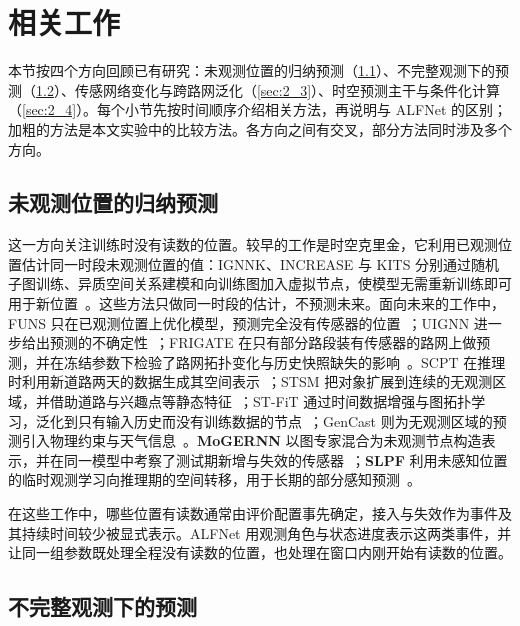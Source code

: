 \section{相关工作}\label{sec:related}
本节按四个方向回顾已有研究：未观测位置的归纳预测（\ref{sec:2_1}）、不完整观测下的预测（\ref{sec:2_2}）、传感网络变化与跨路网泛化（\ref{sec:2_3}）、时空预测主干与条件化计算（\ref{sec:2_4}）。每个小节先按时间顺序介绍相关方法，再说明与 ALFNet 的区别；加粗的方法是本文实验中的比较方法。各方向之间有交叉，部分方法同时涉及多个方向。

\subsection{未观测位置的归纳预测}\label{sec:2_1}

这一方向关注训练时没有读数的位置。较早的工作是时空克里金，它利用已观测位置估计同一时段未观测位置的值：IGNNK、INCREASE 与 KITS 分别通过随机子图训练、异质空间关系建模和向训练图加入虚拟节点，使模型无需重新训练即可用于新位置~\citep{wu2021inductive,zheng2023increase,xu2025kits}。这些方法只做同一时段的估计，不预测未来。面向未来的工作中，FUNS 只在已观测位置上优化模型，预测完全没有传感器的位置~\citep{roth2022forecasting}；UIGNN 进一步给出预测的不确定性~\citep{mei2023uncertainty}；FRIGATE 在只有部分路段装有传感器的路网上做预测，并在冻结参数下检验了路网拓扑变化与历史快照缺失的影响~\citep{gupta2023frigate}。SCPT 在推理时利用新道路两天的数据生成其空间表示~\citep{prabowo2024traffic}；STSM 把对象扩展到连续的无观测区域，并借助道路与兴趣点等静态特征~\citep{su2024spatial}；ST-FiT 通过时间数据增强与图拓扑学习，泛化到只有输入历史而没有训练数据的节点~\citep{lei2025stfit}；GenCast 则为无观测区域的预测引入物理约束与天气信息~\citep{su2026generalising}。\textbf{MoGERNN} 以图专家混合为未观测节点构造表示，并在同一模型中考察了测试期新增与失效的传感器~\citep{zhou2025mogernn}；\textbf{SLPF} 利用未感知位置的临时观测学习向推理期的空间转移，用于长期的部分感知预测~\citep{liu2025spatiotemporal}。

在这些工作中，哪些位置有读数通常由评价配置事先确定，接入与失效作为事件及其持续时间较少被显式表示。ALFNet 用观测角色与状态进度表示这两类事件，并让同一组参数既处理全程没有读数的位置，也处理在窗口内刚开始有读数的位置。

\subsection{不完整观测下的预测}\label{sec:2_2}

